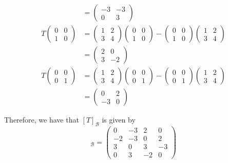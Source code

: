 \documentclass[a4paper, 11pt]{article}
\newenvironment{solution}{%
	\begin{list}{}{%
			\setlength{\topsep}{0pt}%
			\setlength{\leftmargin}{1.5cm}%
			\setlength{\rightmargin}{1.5cm}%
			\setlength{\listparindent}{\parindent}%
			\setlength{\itemindent}{\parindent}%
			\setlength{\parsep}{\parskip}%
		}%
		\item[]}{\end{list}}
\begin{document}
\begin{solution}
\begin{align*}
    &= \begin{pmatrix} -3 & -3 \\ 0 & 3 \end{pmatrix}\\
    T\begin{pmatrix}0 & 0 \\ 1 & 0 \end{pmatrix} &= \begin{pmatrix} 1 & 2 \\ 3 & 4 \end{pmatrix}\begin{pmatrix}0 & 0 \\ 1 & 0 \end{pmatrix}-\begin{pmatrix}0 & 0 \\ 1 & 0 \end{pmatrix}\begin{pmatrix} 1 & 2 \\ 3 & 4 \end{pmatrix} \\
    &= \begin{pmatrix} 2 & 0 \\ 3 & -2 \end{pmatrix} \\
    T\begin{pmatrix}0 & 0 \\ 0 & 1 \end{pmatrix} &= \begin{pmatrix} 1 & 2 \\ 3 & 4 \end{pmatrix}\begin{pmatrix}0 & 0 \\ 0 & 1 \end{pmatrix}-\begin{pmatrix}0 & 0 \\ 0 & 1 \end{pmatrix}\begin{pmatrix} 1 & 2 \\ 3 & 4 \end{pmatrix} \\
    &= \begin{pmatrix} 0 & 2 \\ -3 & 0 \end{pmatrix} 
  \end{align*}

  \noindent Therefore, we have that $[T]_\mathcal{B}$ is given by
  \begin{equation*}
    [T]_\mathcal{B} = \begin{pmatrix}
      0 & -3 & 2 & 0 \\
      -2 & -3 & 0 & 2 \\
      3 & 0 & 3 & -3 \\
      0 & 3 & -2 & 0
    \end{pmatrix}
  \end{equation*}
\end{solution}
\end{document}
